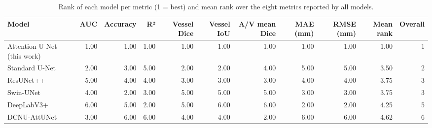 \begin{table}
\caption{Rank of each model per metric (1 = best) and mean rank over the eight metrics reported by all models.}
\label{tab:model_ranking}
\begin{tabular}{lrrrrrrrrrr}
\toprule
Model & AUC & Accuracy & R² & Vessel Dice & Vessel IoU & A/V mean Dice & MAE (mm) & RMSE (mm) & Mean rank & Overall \\
\midrule
Attention U-Net (this work) & 1.00 & 1.00 & 1.00 & 1.00 & 1.00 & 1.00 & 1.00 & 1.00 & 1.00 & 1 \\
Standard U-Net & 2.00 & 3.00 & 5.00 & 2.00 & 2.00 & 4.00 & 5.00 & 5.00 & 3.50 & 2 \\
ResUNet++ & 5.00 & 4.00 & 4.00 & 3.00 & 3.00 & 3.00 & 4.00 & 4.00 & 3.75 & 3 \\
Swin-UNet & 4.00 & 2.00 & 3.00 & 5.00 & 5.00 & 5.00 & 3.00 & 3.00 & 3.75 & 3 \\
DeepLabV3+ & 6.00 & 5.00 & 2.00 & 5.00 & 6.00 & 6.00 & 2.00 & 2.00 & 4.25 & 5 \\
DCNU-AttUNet & 3.00 & 6.00 & 6.00 & 4.00 & 4.00 & 2.00 & 6.00 & 6.00 & 4.62 & 6 \\
\bottomrule
\end{tabular}
\end{table}
